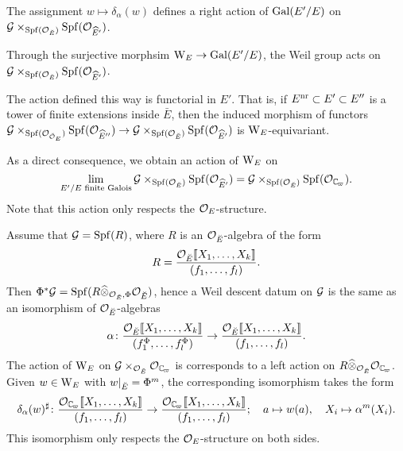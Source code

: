 \documentclass[../main.tex]{subfiles}
\begin{document}
\begin{lem}\label{lem:WeilDDIndAction}
  The assignment $w \mapsto \delta_\alpha(w)$ defines a right action 
  of $\operatorname{Gal}(E'/E)$ on $\mathcal{G} \times_{\operatorname{Spf}(\mathcal{O}_{\breve {E}})}\operatorname{Spf}(\mathcal{O}_{\widehat E'})$.
\end{lem}

Through the surjective morphsim $\mathrm W_E \to \operatorname{Gal}(E'/E)$, the Weil group acts
on $\mathcal{G} \times_{\operatorname{Spf}(\mathcal{O}_{\breve {E}})}\operatorname{Spf}(\mathcal{O}_{\widehat E'})$.

\begin{lem}\label{lem:WeilGroupActionIsFunctorialInE}
  The action defined this way is functorial in $E'$. That is, 
  if $E^{\mathrm{nr}} \subset E' \subset E''$ is a
  tower of finite extensions inside $\bar E$, then the induced morphism of
  functors 
  $\mathcal{G} \times_{\operatorname{Spf}(\mathcal{O}_{{\breve {\mathcal{O}}}_E})} \operatorname{Spf}(\mathcal{O}_{\widehat E''}) \to 
  \mathcal{G} \times_{\operatorname{Spf}(\mathcal{O}_{\breve {E}})} \operatorname{Spf}(\mathcal{O}_{\widehat E'})$
  is $\mathrm W_E$-equivariant. 
\end{lem}
As a direct consequence, we obtain an action of $\mathrm W_E$ on
$$\lim_{E'/E \text{ finite Galois}} \cG \times_{\spf(\cO_\br E)} \spf(\cO_{\hat
E'}) = \cG \times_{\spf(\cO_\br E)} \spf(\cO_{\Cp}).$$ Note that this action 
only respects the $\mathcal{O}_E$-structure.

\begin{xpl}
  Assume that $\mathcal{G} = \operatorname{Spf}(R)$, where $R$ is an $\mathcal{O}_{\breve {E}}$-algebra of 
  the form
  \begin{equation*}
    R = \frac{\mathcal{O}_{\breve {E}} \llbracket X_1, \dots, X_k \rrbracket}{(f_1, \dots, f_l)}.
  \end{equation*}
  Then $\Phi^*\mathcal{G} = \operatorname{Spf}(R \widehat \otimes_{\mathcal{O}_{\breve {E}}, \Phi} \mathcal{O}_{\breve {E}})$,
  hence a Weil descent datum on $\mathcal{G}$ is the same as an isomorphism
  of $\mathcal{O}_{\breve {E}}$-algebras
  \begin{equation*}
    \alpha\colon 
    \frac{\mathcal{O}_{\breve {E}} \llbracket X_1, \dots, X_k \rrbracket}{(f_1^\Phi, \dots, f_l^\Phi)}
    \to 
    \frac{\mathcal{O}_{\breve {E}} \llbracket X_1, \dots, X_k \rrbracket}{(f_1, \dots, f_l)}.
  \end{equation*}
  The action of $\mathrm W_E$ on $\cG \times_{\cO_\br E} \cO_\Cp$
  is corresponds to a left action on $R \cotimes_{\cO_\br E}\cO_\Cp$.
  Given $w \in \mathrm W_E$ with $w|_{\breve {E}} = \Phi^m$, the corresponding
  isomorphism takes the form
  \begin{equation*}
    \delta_\alpha(w)^\sharp \colon 
    \frac{\cO_\Cp \llbr X_1, \dots, X_k \rrbr}{(f_1, \dots, f_l)} \to 
    \frac{\cO_\Cp \llbr X_1, \dots, X_k \rrbr}{(f_1, \dots, f_l)};
    \quad a \mapsto w(a), \quad X_i \mapsto \alpha^m(X_i).
  \end{equation*}
  This isomorphism only respects the $\mathcal{O}_E$-structure on both sides.
\end{xpl}
\end{document}
